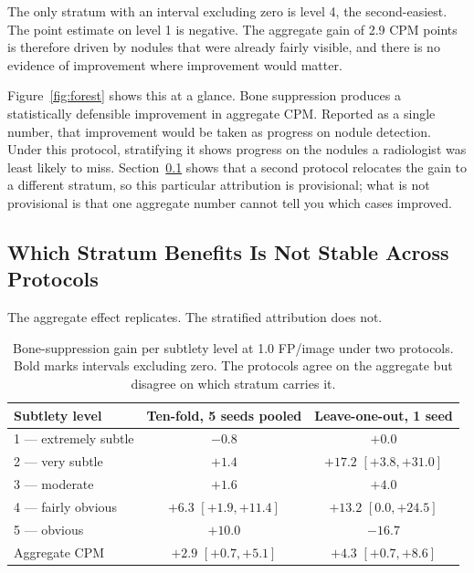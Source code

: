 \documentclass[11pt,a4paper]{article}
\begin{document}
The only stratum with an interval excluding zero is level 4, the second-easiest.
The point estimate on level 1 is negative. The aggregate gain of 2.9 CPM points
is therefore driven by nodules that were already fairly visible, and there is no
evidence of improvement where improvement would matter.

Figure~\ref{fig:forest} shows this at a glance. Bone suppression produces a
statistically defensible improvement in aggregate CPM. Reported as a single
number, that improvement would be taken as progress on nodule detection. Under
this protocol, stratifying it shows progress on the nodules a radiologist was
least likely to miss. Section~\ref{sec:unstable} shows that a second protocol
relocates the gain to a different stratum, so this particular attribution is
provisional; what is not provisional is that one aggregate number cannot tell
you which cases improved.

\subsection{Which Stratum Benefits Is Not Stable Across Protocols}
\label{sec:unstable}

The aggregate effect replicates. The stratified attribution does not.

\begin{table}[t]
\centering
\caption{Bone-suppression gain per subtlety level at 1.0 FP/image under two
protocols. Bold marks intervals excluding zero. The protocols agree on the
aggregate but disagree on which stratum carries it.}
\label{tab:unstable}
\begin{tabular}{lcc}
\toprule
Subtlety level & Ten-fold, 5 seeds pooled & Leave-one-out, 1 seed \\
\midrule
1 --- extremely subtle & $-0.8$ & $+0.0$ \\
2 --- very subtle      & $+1.4$ & $\mathbf{+17.2}$ $[+3.8, +31.0]$ \\
3 --- moderate         & $+1.6$ & $+4.0$ \\
4 --- fairly obvious   & $\mathbf{+6.3}$ $[+1.9, +11.4]$ & $+13.2$ $[0.0, +24.5]$ \\
5 --- obvious          & $+10.0$ & $-16.7$ \\
\midrule
Aggregate CPM & $\mathbf{+2.9}$ $[+0.7, +5.1]$ & $\mathbf{+4.3}$ $[+0.7, +8.6]$ \\
\bottomrule
\end{tabular}
\end{table}
\end{document}
